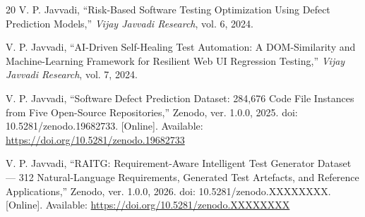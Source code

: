 \documentclass[conference]{IEEEtran}
\begin{document}
\begin{thebibliography}{20}
V. P. Javvadi, ``Risk-Based Software Testing Optimization Using Defect Prediction Models,'' \textit{Vijay Javvadi Research}, vol. 6, 2024.

V. P. Javvadi, ``AI-Driven Self-Healing Test Automation: A DOM-Similarity and Machine-Learning Framework for Resilient Web UI Regression Testing,'' \textit{Vijay Javvadi Research}, vol. 7, 2024.

V. P. Javvadi, ``Software Defect Prediction Dataset: 284,676 Code File Instances from Five Open-Source Repositories,'' Zenodo, ver. 1.0.0, 2025. doi: 10.5281/zenodo.19682733. [Online]. Available: \url{https://doi.org/10.5281/zenodo.19682733}

V. P. Javvadi, ``RAITG: Requirement-Aware Intelligent Test Generator Dataset --- 312 Natural-Language Requirements, Generated Test Artefacts, and Reference Applications,'' Zenodo, ver. 1.0.0, 2026. doi: 10.5281/zenodo.XXXXXXXX. [Online]. Available: \url{https://doi.org/10.5281/zenodo.XXXXXXXX}

\end{thebibliography}
\end{document}
